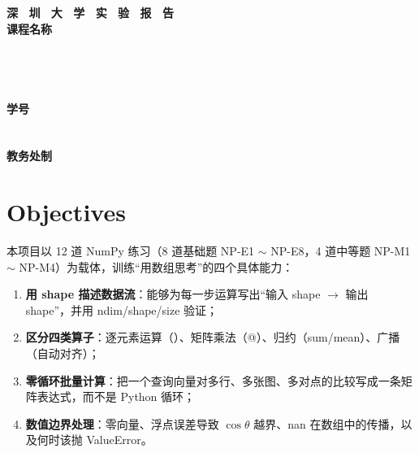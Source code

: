 \documentclass[a4paper,12pt]{article}
\newcommand{\code}[1]{{\ttfamily\footnotesize #1}}
\begin{document}
\begin{titlepage}
    \centering
    \vspace*{2cm}
    \Huge{\textbf{深 \ 圳 \ 大 \ 学 \ 实 \ 验 \ 报 \ 告}}\\[1.5cm]

    {\Large\textbf{课程名称}\quad\underline{}}\\[0.5cm]
{\Large
\noindent{}
\underline{}}\\[0.5cm]
{\Large
\noindent{}
\underline{}}\\[0.5cm]
{\Large
\noindent{}
\underline{}}\\[0.5cm]
{\Large
\noindent{}
\underline{}}\\[0.5cm]
{\Large
\noindent{}
\underline{}
\hspace{0.5cm}
\textbf{学号}
\underline{}}\\[0.5cm]
{\Large
\noindent{}
\underline{}}\\[0.5cm]
{\Large
\noindent{}
\underline{}}\\[1.5cm]

    \vfill
    \Large{\textbf{教务处制}}
\end{titlepage}

\newpage


\section{Objectives}

本项目以 12 道 NumPy 练习（8 道基础题 NP-E1 $\sim$ NP-E8，4 道中等题 NP-M1 $\sim$ NP-M4）为载体，训练“用数组思考”的四个具体能力：

\begin{enumerate}[label=(\arabic*)]
    \item \textbf{用 shape 描述数据流}：能够为每一步运算写出“输入 shape $\rightarrow$ 输出 shape”，并用 \code{ndim/shape/size} 验证；
    \item \textbf{区分四类算子}：逐元素运算（\code{*}）、矩阵乘法（\code{@}）、归约（\code{sum/mean}）、广播（自动对齐）；
    \item \textbf{零循环批量计算}：把一个查询向量对多行、多张图、多对点的比较写成一条矩阵表达式，而不是 Python 循环；
    \item \textbf{数值边界处理}：零向量、浮点误差导致 $\cos\theta$ 越界、\code{nan} 在数组中的传播，以及何时该抛 \code{ValueError}。
\end{enumerate}
\end{document}
